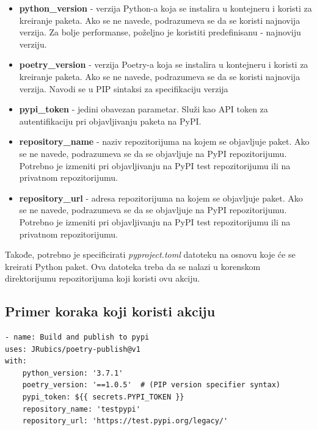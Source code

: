 \documentclass[12pt]{report}
\begin{document}
\begin{itemize}
    \item \textbf{python\_version} - verzija Python-a koja se instalira u kontejneru i koristi za kreiranje paketa. Ako se ne navede, podrazumeva se da se koristi najnovija verzija. Za bolje performanse, poželjno je koristiti predefinisanu - najnoviju verziju.
    \item \textbf{poetry\_version} - verzija Poetry-a koja se instalira u kontejneru i koristi za kreiranje paketa. Ako se ne navede, podrazumeva se da se koristi najnovija verzija. Navodi se u PIP sintaksi za specifikaciju verzija
    \item \textbf{pypi\_token} - jedini obavezan parametar. Služi kao API token za autentifikaciju pri objavljivanju paketa na PyPI.
    \item \textbf{repository\_name} - naziv repozitorijuma na kojem se objavljuje paket. Ako se ne navede, podrazumeva se da se objavljuje na PyPI repozitorijumu. Potrebno je izmeniti pri objavljivanju na PyPI test repozitorijumu ili na privatnom repozitorijumu.
    \item \textbf{repository\_url} - adresa repozitorijuma na kojem se objavljuje paket. Ako se ne navede, podrazumeva se da se objavljuje na PyPI repozitorijumu. Potrebno je izmeniti pri objavljivanju na PyPI test repozitorijumu ili na privatnom repozitorijumu.
\end{itemize}

Takođe, potrebno je specificirati \textit{pyproject.toml} datoteku na osnovu koje će se kreirati Python paket. Ova datoteka treba da se nalazi u korenskom direktorijumu repozitorijuma koji koristi ovu akciju.

\subsection{Primer koraka koji koristi akciju}

\begin{verbatim}
- name: Build and publish to pypi
uses: JRubics/poetry-publish@v1
with:
    python_version: '3.7.1'
    poetry_version: '==1.0.5'  # (PIP version specifier syntax)
    pypi_token: ${{ secrets.PYPI_TOKEN }}
    repository_name: 'testpypi'
    repository_url: 'https://test.pypi.org/legacy/'
\end{verbatim}
\end{document}
